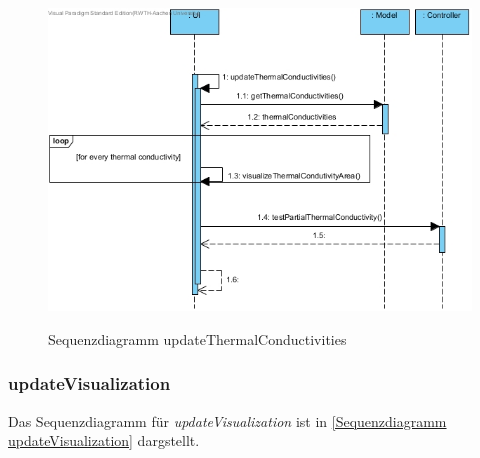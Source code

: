 \begin{figure}[H]
	\centering
	\includegraphics[scale=.6]{Bilder/UI__updateThermalConductivities().jpg}\\
	\caption{Sequenzdiagramm updateThermalConductivities}
	\label{Sequenzdiagramm updateThermalConductivities}
\end{figure}

\subsubsection*{updateVisualization}

Das Sequenzdiagramm für \emph{updateVisualization} ist in \ref{Sequenzdiagramm updateVisualization} dargstellt.

